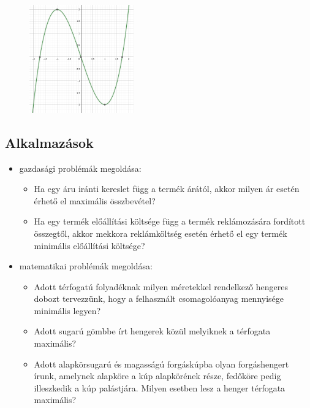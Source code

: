 \documentclass[12pt,a4paper]{article}
\begin{document}
\begin{figure}[h]
\centering
\includegraphics[width=0.4\textwidth]{fgv_elemzes}
\end{figure}
\vspace{30px}

\subsection{Alkalmazások}
\begin{itemize}
\item gazdasági problémák megoldása:
\begin{itemize}
\item Ha egy áru iránti kereslet függ a termék árától, akkor milyen ár esetén érhető el maximális összbevétel?
\item Ha egy termék előállítási költsége függ a termék reklámozására fordított összegtől, akkor mekkora reklámköltség esetén érhető el egy termék minimális előállítási költsége?
\end{itemize}
\item matematikai problémák megoldása:
\begin{itemize}
\item Adott térfogatú folyadéknak milyen méretekkel rendelkező hengeres dobozt tervezzünk, hogy a felhasznált csomagolóanyag mennyisége minimális legyen?
\item Adott sugarú gömbbe írt hengerek közül melyiknek a térfogata maximális?
\item Adott alapkörsugarú és magasságú forgáskúpba olyan forgáshengert írunk, amelynek alapköre a kúp alapkörének része, fedőköre pedig illeszkedik a kúp palástjára. Milyen esetben lesz a henger térfogata maximális?
\end{itemize}
\end{itemize}
\newpage
\end{document}
